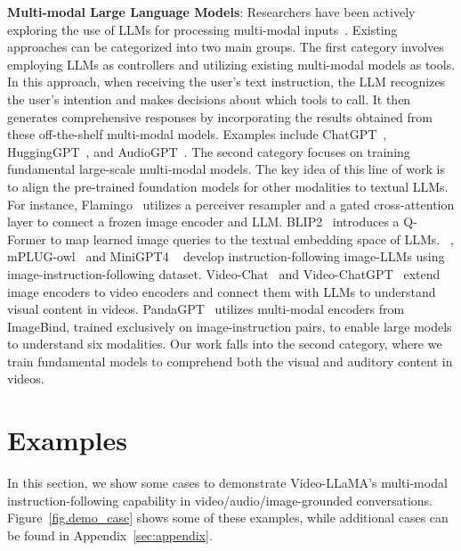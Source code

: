 \documentclass[11pt]{article}
\begin{document}
\textbf{Multi-modal Large Language Models}: 
Researchers have been actively exploring the use of LLMs for processing multi-modal inputs~\citep{gao2023llamaadaptervp,li2023videochatcv}. Existing approaches can be categorized into two main groups. The first category involves employing LLMs as controllers and utilizing existing multi-modal models as tools. In this approach, when receiving the user's text instruction, the LLM recognizes the user's intention and makes decisions about which tools to call. It then generates comprehensive responses by incorporating the results obtained from these off-the-shelf multi-modal models. Examples include ChatGPT~\citep{wu2023visual}, HuggingGPT~\citep{shen2023hugginggpt}, and AudioGPT~\citep{huang2023audiogpt}. 
The second category focuses on training fundamental large-scale multi-modal models. The key idea of this line of work is to align the pre-trained foundation models for other modalities to textual LLMs. For instance, Flamingo~\citep{alayrac2022flamingo} utilizes a perceiver resampler and a gated cross-attention layer to connect a frozen image encoder and LLM.
BLIP2~\citep{li2023blip2bl} introduces a Q-Former to map learned image queries to the textual embedding space of LLMs. ~\citep{liu2023visualit}, mPLUG-owl~\citep{ye2023mplugowl} and MiniGPT4 ~\citep{zhu2023minigpt} develop instruction-following image-LLMs using image-instruction-following dataset. Video-Chat~\citep{li2023videochatcv} and Video-ChatGPT~\citep{maaz2023videochatgpt} extend image encoders to video encoders and connect them with LLMs to understand visual content in videos. PandaGPT~\citep{pandagpt} utilizes multi-modal encoders from ImageBind, trained exclusively on image-instruction pairs, to enable large models to understand six modalities. Our work falls into the second category, where we train fundamental models to comprehend both the visual and auditory content in videos. 




\section{Examples}
In this section, we show some cases to demonstrate Video-LLaMA's  multi-modal instruction-following capability in video/audio/image-grounded conversations. Figure~\ref{fig.demo_case} shows some of these examples, while additional cases can be found in  Appendix~\ref{sec:appendix}.
\end{document}
